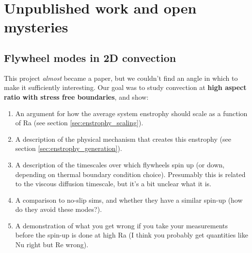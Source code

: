 \chapter{Unpublished work and open mysteries}
\label{ch:unpublished}

\section{Flywheel modes in 2D convection}
\label{sec:flywheels}
This project \emph{almost} became a paper, but we couldn't find an angle in which to make it sufficiently interesting.
Our goal was to study \RB convection at \textbf{high aspect ratio with stress free boundaries}, and show:
\begin{enumerate}
\item An argument for how the average system enstrophy should scale as a function of Ra (see section \ref{sec:enstrophy_scaling}).
\item A description of the physical mechanism that creates this enstrophy (see section \ref{sec:enstrophy_generation}).
\item A description of the timescales over which flywheels spin up (or down, depending on thermal boundary condition choice).
Presumably this is related to the viscous diffusion timescale, but it's a bit unclear what it is.
\item A comparison to no-slip sims, and whether they have a similar spin-up (how do they avoid these modes?).
\item A demonstration of what you get wrong if you take your measurements before the spin-up is done at high Ra (I think you probably get quantities like Nu right but Re wrong).
\end{enumerate}

